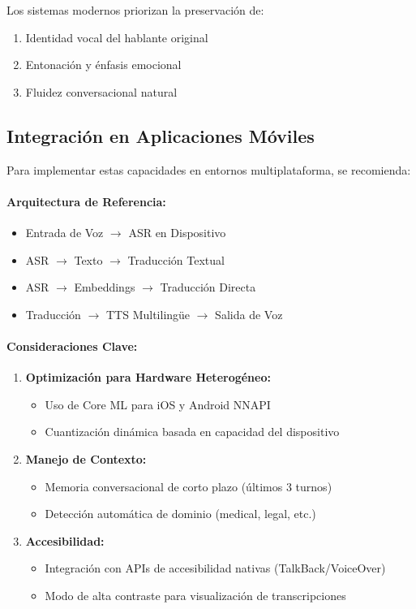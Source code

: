 Los sistemas modernos priorizan la preservación de:
\begin{enumerate}
    \item Identidad vocal del hablante original
    \item Entonación y énfasis emocional
    \item Fluidez conversacional natural
\end{enumerate}

\subsection{Integración en Aplicaciones Móviles}

Para implementar estas capacidades en entornos multiplataforma, se recomienda:

\paragraph{Arquitectura de Referencia:}
\begin{itemize}
    \item Entrada de Voz $\rightarrow$ ASR en Dispositivo
    \item ASR $\rightarrow$ Texto $\rightarrow$ Traducción Textual
    \item ASR $\rightarrow$ Embeddings $\rightarrow$ Traducción Directa
    \item Traducción $\rightarrow$ TTS Multilingüe $\rightarrow$ Salida de Voz
\end{itemize}

\paragraph{Consideraciones Clave:}
\begin{enumerate}
    \item \textbf{Optimización para Hardware Heterogéneo:}
    \begin{itemize}
        \item Uso de Core ML para iOS y Android NNAPI
        \item Cuantización dinámica basada en capacidad del dispositivo
    \end{itemize}
    
    \item \textbf{Manejo de Contexto:}
    \begin{itemize}
        \item Memoria conversacional de corto plazo (últimos 3 turnos)
        \item Detección automática de dominio (medical, legal, etc.)
    \end{itemize}
    
    \item \textbf{Accesibilidad:}
    \begin{itemize}
        \item Integración con APIs de accesibilidad nativas (TalkBack/VoiceOver)
        \item Modo de alta contraste para visualización de transcripciones
    \end{itemize}
\end{enumerate}

